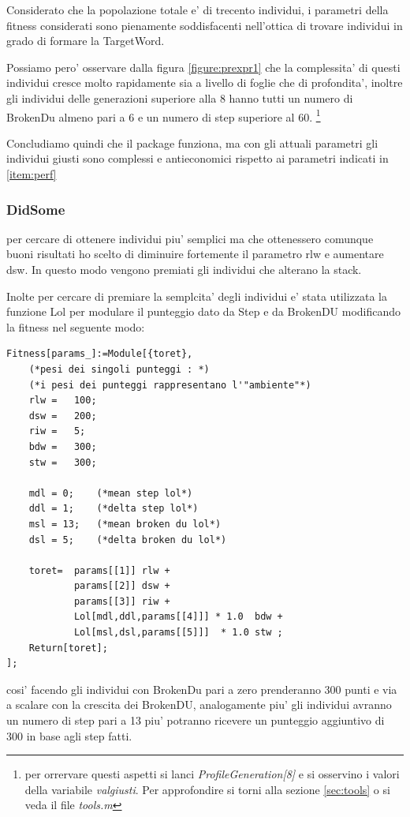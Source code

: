 \documentclass[12pt, a4paper]{article}
\begin{document}
Considerato che la popolazione totale e' di trecento individui, i parametri della fitness considerati sono pienamente soddisfacenti nell'ottica di trovare individui in grado di formare la TargetWord.

Possiamo pero' osservare dalla figura \ref{figure:prexpr1} che la complessita' di questi individui cresce molto rapidamente sia a livello di foglie che di profondita', inoltre gli individui delle generazioni superiore alla 8 hanno tutti un numero di BrokenDu almeno pari a 6 e un numero di step superiore al 60.
\footnote{per orrervare questi aspetti si lanci {\itshape ProfileGeneration[8]} e si osservino i valori della variabile {\itshape valgiusti}. Per approfondire si torni alla sezione \ref{sec:tools} o si veda il file {\itshape tools.m}}

Concludiamo quindi che il package funziona, ma con gli attuali parametri gli individui giusti sono complessi e antieconomici rispetto ai parametri indicati in \ref{item:perf}

\subsubsection{DidSome}
per cercare di ottenere individui piu' semplici ma che ottenessero comunque buoni risultati ho scelto di diminuire fortemente il parametro rlw e aumentare dsw. In questo modo vengono premiati gli individui che alterano la stack.

Inolte per cercare di premiare la semplcita' degli individui e' stata utilizzata la funzione Lol per modulare il punteggio dato da Step e da BrokenDU modificando la fitness nel seguente modo:
\begin{lstlisting}
Fitness[params_]:=Module[{toret},
	(*pesi dei singoli punteggi : *)
	(*i pesi dei punteggi rappresentano l'"ambiente"*)
	rlw	=	100;
	dsw	=	200;
	riw	=	5;
	bdw	=	300;
	stw	=	300;

	mdl = 0;	(*mean step lol*) 
	ddl = 1;	(*delta step lol*) 
	msl = 13;	(*mean broken du lol*) 
	dsl = 5;	(*delta broken du lol*) 

	toret=	params[[1]] rlw + 
			params[[2]] dsw + 
			params[[3]] riw +
			Lol[mdl,ddl,params[[4]]] * 1.0  bdw + 
			Lol[msl,dsl,params[[5]]]  * 1.0 stw ;  
	Return[toret];
];
\end{lstlisting}

cosi' facendo gli individui con BrokenDu pari a zero prenderanno 300 punti e via a scalare con la crescita dei BrokenDU, analogamente piu' gli individui avranno un numero di step pari a 13 piu' potranno ricevere un punteggio aggiuntivo di 300 in base agli step fatti.
\end{document}
